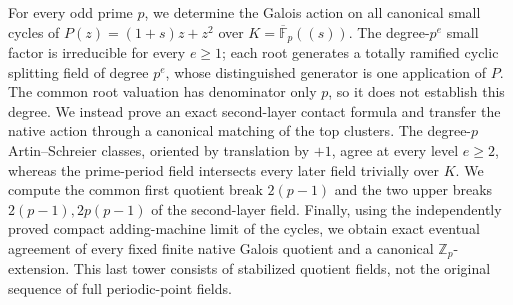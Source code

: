 For every odd prime \(p\), we determine the Galois action on all canonical
small cycles of \(P(z)=(1+s)z+z^2\) over
\(K=\overline{\mathbb F}_p((s))\).
The degree-\(p^e\) small factor is irreducible for every \(e\ge1\);
each root generates a totally ramified cyclic splitting field of degree
\(p^e\), whose distinguished generator is one application of \(P\).
The common root valuation has denominator only \(p\), so it does not
establish this degree. We instead prove an exact second-layer contact
formula and transfer the native action through a canonical matching of
the top clusters. The degree-\(p\) Artin--Schreier classes, oriented by
translation by \(+1\), agree at every level \(e\ge2\), whereas the
prime-period field intersects every later field trivially over \(K\).
We compute the common first quotient break \(2(p-1)\) and the two upper
breaks \(2(p-1),2p(p-1)\) of the second-layer field.
Finally, using the independently proved compact adding-machine limit
of the cycles, we obtain exact eventual agreement of every fixed finite
native Galois quotient and a canonical \(\mathbb Z_p\)-extension.
This last tower consists of stabilized quotient fields, not the
original sequence of full periodic-point fields.
